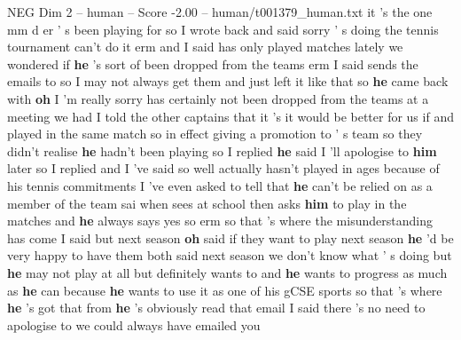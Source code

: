 \begin{textsample}{NEG Dim 2 – human – Score -2.00 – human/t001379\_human.txt}  \label{ex:f2_neg_011}
it 's the one mm d er ' s been playing for so I wrote back and said sorry ' s doing the tennis tournament can't do it erm and I said has only played matches lately we wondered if \textbf{he} 's sort of been dropped from the teams erm I said sends the emails to so I may not always get them and just left it like that so \textbf{he} came back with \textbf{oh} I 'm really sorry has certainly not been dropped from the teams at a meeting we had I told the other captains that it 's it would be better for us if and played in the same match so in effect giving a promotion to ' s team so they didn't realise \textbf{he} hadn't been playing so I replied \textbf{he} said I 'll apologise to \textbf{him} later so I replied and I 've said so well actually hasn't played in ages because of his tennis commitments I 've even asked to tell that \textbf{he} can't be relied on as a member of the team sai when sees at school then asks \textbf{him} to play in the matches and \textbf{he} always says yes so erm so that 's where the misunderstanding has come I said but next season \textbf{oh} said if they want to play next season \textbf{he} 'd be very happy to have them both said next season we don't know what ' s doing but \textbf{he} may not play at all but definitely wants to and \textbf{he} wants to progress as much as \textbf{he} can because \textbf{he} wants to use it as one of his gCSE sports so that 's where \textbf{he} 's got that from \textbf{he} 's obviously read that email I said there 's no need to apologise to we could always have emailed you

\end{textsample}
